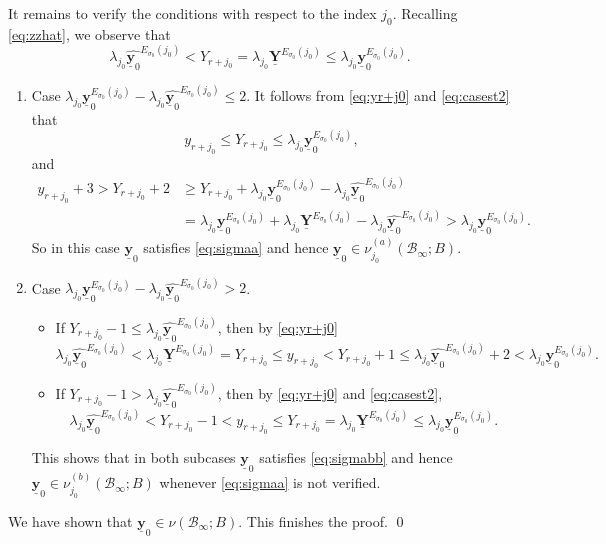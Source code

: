 \documentclass[11pt,letterpaper]{amsart}
\newcommand{\CB}{{\mathcal {B}}}
\newcommand{\YY}{\underline{\mathbf{Y}}}
\newcommand{\yy}{\underline{\mathbf{y}}}
\theoremstyle{plain}
\numberwithin{equation}{section}
\theoremstyle{definition}
\theoremstyle{remark}
\begin{document}
It remains to verify the conditions with respect to the index $j_0$. Recalling \eqref{eq:zzhat}, we observe that \begin{equation}\label{eq:casest2}
	\lambda_{j_0}\widehat{\yy_0}^{E_{\sigma_0}(j_0)}<Y_{r+j_0}=\lambda_{j_0}\YY^{E_{\sigma_0}(j_0)}\leqslant \lambda_{j_0}\yy_0^{E_{\sigma_0}(j_0)}.
\end{equation}  
	\begin{enumerate}
			\item Case $\lambda_{j_0}\yy_0^{E_{\sigma_0}(j_0)}-\lambda_{j_0}\widehat{\yy_0}^{E_{\sigma_0}(j_0)}\leqslant 2$.  It follows from  \eqref{eq:yr+j0} and \eqref{eq:casest2} that $$y_{r+j_0}\leqslant Y_{r+j_0}\leqslant\lambda_{j_0}\yy_0^{E_{\sigma_0}(j_0)},$$ and
		\begin{align*}
			y_{r+j_0}+3>Y_{r+j_0}+2&\geqslant Y_{r+j_0}+\lambda_{j_0}\yy_0^{E_{\sigma_0}(j_0)}-\lambda_{j_0}\widehat{\yy_0}^{E_{\sigma_0}(j_0)}\\ &=\lambda_{j_0}\yy_0^{E_{\sigma_0}(j_0)}+\lambda_{j_0}\YY^{E_{\sigma_0}(j_0)}-\lambda_{j_0}\widehat{\yy_0}^{E_{\sigma_0}(j_0)}>\lambda_{j_0}\yy_0^{E_{\sigma_0}(j_0)}.
		\end{align*}
		So in this case $\yy_0$ satisfies \eqref{eq:sigmaa} and hence $\yy_0\in \nu_{j_0}^{(a)}(\CB_\infty;B)$. 
		\item Case $\lambda_{j_0}\yy_0^{E_{\sigma_0}(j_0)}-\lambda_{j_0}\widehat{\yy_0}^{E_{\sigma_0}(j_0)}>2$.
\begin{itemize}
		\item If $Y_{r+j_0}-1\leqslant \lambda_{j_0}\widehat{\yy_0}^{E_{\sigma_0}(j_0)}$, then  by \eqref{eq:yr+j0} 
	 $$\lambda_{j_0}\widehat{\yy_0}^{E_{\sigma_0}(j_0)}<\lambda_{j_0}\YY^{E_{\sigma_0}(j_0)}=Y_{r+j_0}\leqslant y_{r+j_0}<Y_{r+j_0}+1\leqslant\lambda_{j_0}\widehat{\yy_0}^{E_{\sigma_0}(j_0)}+2<\lambda_{j_0}\yy_0^{E_{\sigma_0}(j_0)}.$$ 
		\item If $Y_{r+j_0}-1> \lambda_{j_0}\widehat{\yy_0}^{E_{\sigma_0}(j_0)}$, then by \eqref{eq:yr+j0} and \eqref{eq:casest2}, $$\lambda_{j_0}\widehat{\yy_0}^{E_{\sigma_0}(j_0)}<Y_{r+j_0}-1<y_{r+j_0}\leqslant Y_{r+j_0}= \lambda_{j_0}\YY^{E_{\sigma_0}(j_0)}\leqslant \lambda_{j_0}\yy_0^{E_{\sigma_0}(j_0)}.$$ 
	\end{itemize}  	
This shows that in both subcases $\yy_0$ satisfies \eqref{eq:sigmabb} and hence $\yy_0\in \nu_{j_0}^{(b)}(\CB_\infty;B)$ whenever \eqref{eq:sigmaa} is not verified.
	\end{enumerate} 
	
	We have shown that $\yy_0\in\nu(\CB_\infty;B)$.	This finishes the proof.
\qed
\end{document}
